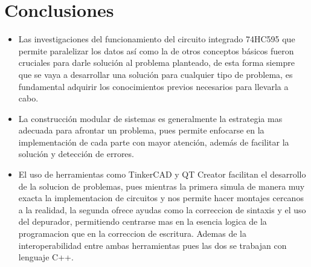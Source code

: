 \documentclass{article}
\begin{document}
\vspace{6cm}
\section{Conclusiones} \label{conclusiones}
\begin{itemize}
    \item Las investigaciones del funcionamiento del circuito integrado 74HC595 que permite paralelizar los datos así como la de otros conceptos básicos fueron cruciales para darle solución al problema planteado, de esta forma siempre que se vaya a desarrollar una solución para cualquier tipo de problema, es fundamental adquirir los conocimientos previos necesarios para llevarla a cabo. 
    \item La construcción modular de sistemas es generalmente la estrategia mas adecuada para afrontar un problema, pues permite enfocarse en la implementación de cada parte con mayor atención, además de facilitar la solución y detección de errores.
    \item El uso de herramientas como TinkerCAD y QT Creator facilitan el desarrollo de la solucion de problemas, pues mientras la primera simula de manera muy exacta la implementacion de circuitos y nos permite hacer montajes cercanos a la realidad, la segunda ofrece ayudas como la correccion de sintaxis y el uso del depurador, permitiendo centrarse mas en la esencia logica de la programacion que en la correccion de escritura. Ademas de la interoperabilidad entre ambas herramientas pues las dos se trabajan con lenguaje C++. 
\end{itemize}
\vspace{5cm}


\end{document}
